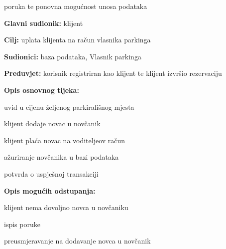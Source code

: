 \begin{packed_item}
\begin{packed_item}
\begin{packed_item}
\begin{packed_enum}
    							\item poruka te ponovna mogućnost unosa podataka
    					
    						\end{packed_enum}
    						
    					\end{packed_item}
    				\end{packed_item}
    				\noindent {}
    			\begin{packed_item}
    				
    				\item \textbf{Glavni sudionik: } klijent
    				\item  \textbf{Cilj:} uplata klijenta na račun vlasnika parkinga
    				\item  \textbf{Sudionici:} baza podataka, Vlasnik parkinga
    				\item  \textbf{Preduvjet:} korisnik registriran kao klijent te klijent izvršio rezervaciju
    				\item  \textbf{Opis osnovnog tijeka:}
    				
    				\item[] \begin{packed_enum}
    					
    					\item uvid u cijenu željenog parkirališnog mjesta
    					\item klijent dodaje novac u novčanik
    					\item klijent plaća novac na voditeljeov račun
    					\item ažuriranje novčanika u bazi podataka
    					\item potvrda o uspješnoj transakciji

    				\end{packed_enum}
    				
    				\item  \textbf{Opis mogućih odstupanja:}
    				
    				\item[] \begin{packed_item}
    					
    					\item[2.a] klijent nema dovoljno novca u novčaniku
    					\item[] \begin{packed_enum}
    						
    						\item ispis poruke
    						\item preusmjeravanje na dodavanje novca u novčanik
    						

\end{packed_enum}
\end{packed_item}
\end{packed_item}
\end{packed_item}
